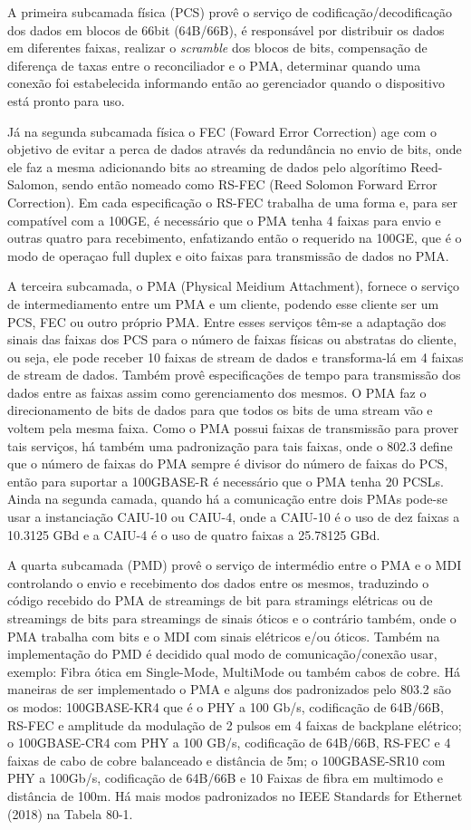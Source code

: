 \documentclass[a4paper,12pt]{article}
\begin{document}
A primeira subcamada física (PCS) provê o serviço de codificação/decodificação dos dados em blocos de 66bit (64B/66B), é responsável por distribuir os dados em diferentes faixas, realizar o \textit{scramble} dos blocos de bits, compensação de diferença de taxas entre o reconciliador e o PMA, determinar quando uma conexão foi estabelecida informando então ao gerenciador quando o dispositivo está pronto para uso. 


Já na segunda subcamada física o FEC (Foward Error Correction) age com o objetivo de evitar a perca de dados através da redundância no envio de bits, onde ele faz a mesma adicionando bits ao streaming de dados pelo algorítimo Reed-Salomon, sendo então nomeado como RS-FEC (Reed Solomon Forward Error Correction). Em cada especificação o RS-FEC trabalha de uma forma e, para ser compatível com a 100GE, é necessário que o PMA tenha 4 faixas para envio e outras quatro para recebimento, enfatizando então o requerido na 100GE, que é o modo de operaçao full duplex e oito faixas para transmissão de dados no PMA.

A terceira subcamada, o PMA (Physical Meidium Attachment), fornece o serviço de intermediamento entre um PMA e um cliente, podendo esse cliente ser um PCS, FEC ou outro próprio PMA. Entre esses serviços têm-se a adaptação dos sinais das faixas dos PCS para o número de faixas físicas ou abstratas do cliente, ou seja, ele pode receber 10 faixas de stream de dados e transforma-lá em 4 faixas de stream de dados. Também provê especificações de tempo para transmissão dos dados entre as faixas assim como gerenciamento dos mesmos. O PMA faz o direcionamento de bits de dados para que todos os bits de uma stream vão e voltem pela mesma faixa. Como o PMA possui faixas de transmissão para prover tais serviços, há também uma padronização para tais faixas, onde o 802.3 define que o número de faixas do PMA sempre é divisor do número de faixas do PCS, então para suportar a 100GBASE-R é necessário que o PMA tenha 20 PCSLs. Ainda na segunda camada, quando há a comunicação entre dois PMAs pode-se usar a instanciação CAIU-10 ou CAIU-4, onde a CAIU-10 é o uso de dez faixas a 10.3125 GBd e a CAIU-4 é o uso de quatro faixas a 25.78125 GBd.


A quarta subcamada (PMD) provê o serviço de intermédio entre o PMA e o MDI controlando o envio e recebimento dos dados entre os mesmos, traduzindo o código recebido do PMA de streamings de bit para stramings elétricas ou de streamings de bits para streamings de sinais óticos e o contrário também, onde o PMA trabalha com bits e o MDI com sinais elétricos e/ou óticos. Também na implementação do PMD é decidido qual modo de comunicação/conexão usar, exemplo: Fibra ótica em Single-Mode, MultiMode ou também cabos de cobre. Há maneiras de ser implementado o PMA e alguns dos padronizados pelo 803.2 são os modos: 100GBASE-KR4 que é o PHY a 100 Gb/s, codificação de 64B/66B, RS-FEC e amplitude da modulação de 2 pulsos em 4 faixas de backplane elétrico; o 100GBASE-CR4 com PHY a 100 GB/s, codificação de 64B/66B, RS-FEC e 4 faixas de cabo de cobre balanceado e distância de 5m; o 100GBASE-SR10 com PHY a 100Gb/s, codificação de 64B/66B e 10 Faixas de fibra em multimodo e distância de 100m. Há mais modos padronizados no IEEE Standards for Ethernet (2018) na Tabela 80-1.
\end{document}
